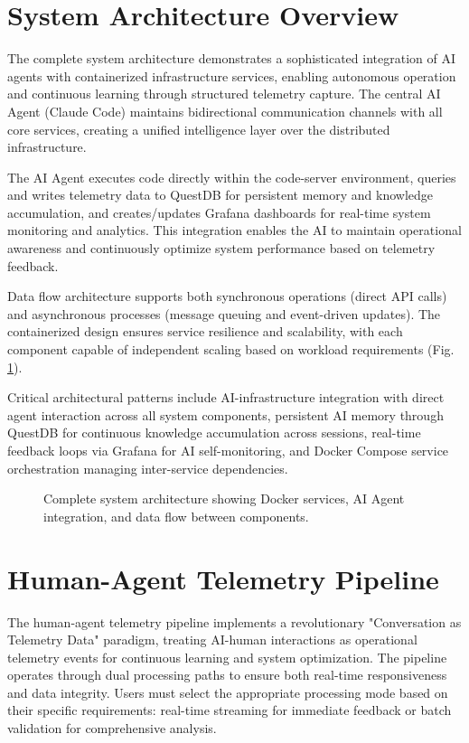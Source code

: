 \documentclass[11pt]{article}
\begin{document}
	\section{System Architecture Overview}
	\label{sec:architecture-overview}
	
	The complete system architecture demonstrates a sophisticated integration of AI agents with containerized infrastructure services, enabling autonomous operation and continuous learning through structured telemetry capture. The central AI Agent (Claude Code) maintains bidirectional communication channels with all core services, creating a unified intelligence layer over the distributed infrastructure.
	
	The AI Agent executes code directly within the code-server environment, queries and writes telemetry data to QuestDB for persistent memory and knowledge accumulation, and creates/updates Grafana dashboards for real-time system monitoring and analytics. This integration enables the AI to maintain operational awareness and continuously optimize system performance based on telemetry feedback.
	
	Data flow architecture supports both synchronous operations (direct API calls) and asynchronous processes (message queuing and event-driven updates). The containerized design ensures service resilience and scalability, with each component capable of independent scaling based on workload requirements (Fig. \ref{fig:architecture}).
	
	Critical architectural patterns include AI-infrastructure integration with direct agent interaction across all system components, persistent AI memory through QuestDB for continuous knowledge accumulation across sessions, real-time feedback loops via Grafana for AI self-monitoring, and Docker Compose service orchestration managing inter-service dependencies.
	
	\begin{figure}[H]
		\centering
		\scalebox{0.75}{}
		\caption{Complete system architecture showing Docker services, AI Agent integration, and data flow between components.}
		\label{fig:architecture}
	\end{figure}
	
	\section{Human-Agent Telemetry Pipeline}
	\label{sec:human-agent-pipeline}
	
	The human-agent telemetry pipeline implements a revolutionary "Conversation as Telemetry Data" paradigm, treating AI-human interactions as operational telemetry events for continuous learning and system optimization. The pipeline operates through dual processing paths to ensure both real-time responsiveness and data integrity. Users must select the appropriate processing mode based on their specific requirements: real-time streaming for immediate feedback or batch validation for comprehensive analysis.
	
\end{document}
